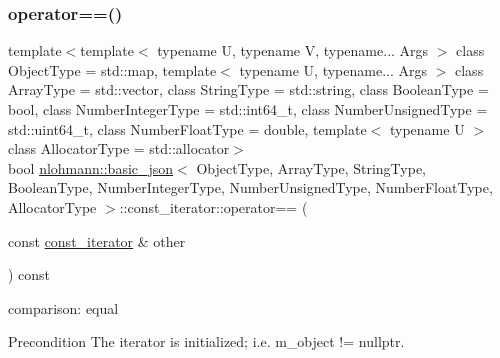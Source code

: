 \subsubsection{\texorpdfstring{operator==()}{operator==()}}
{\footnotesize\ttfamily template$<$template$<$ typename U, typename V, typename... Args $>$ class Object\+Type = std\+::map, template$<$ typename U, typename... Args $>$ class Array\+Type = std\+::vector, class String\+Type  = std\+::string, class Boolean\+Type  = bool, class Number\+Integer\+Type  = std\+::int64\+\_\+t, class Number\+Unsigned\+Type  = std\+::uint64\+\_\+t, class Number\+Float\+Type  = double, template$<$ typename U $>$ class Allocator\+Type = std\+::allocator$>$ \\
bool \hyperlink{classnlohmann_1_1basic__json}{nlohmann\+::basic\+\_\+json}$<$ Object\+Type, Array\+Type, String\+Type, Boolean\+Type, Number\+Integer\+Type, Number\+Unsigned\+Type, Number\+Float\+Type, Allocator\+Type $>$\+::const\+\_\+iterator\+::operator== (\begin{DoxyParamCaption}\item[{const \hyperlink{classnlohmann_1_1basic__json_1_1const__iterator}{const\+\_\+iterator} \&}]{other }\end{DoxyParamCaption}) const\hspace{0.3cm}{\ttfamily [inline]}}



comparison\+: equal 

\begin{DoxyPrecond}{Precondition}
The iterator is initialized; i.\+e. {\ttfamily m\+\_\+object != nullptr}. 
\end{DoxyPrecond}
\hypertarget{classnlohmann_1_1basic__json_1_1const__iterator_a3a7ed729e72bc7c1d0b75ed8cc2bd830}{}\label{classnlohmann_1_1basic__json_1_1const__iterator_a3a7ed729e72bc7c1d0b75ed8cc2bd830} 
